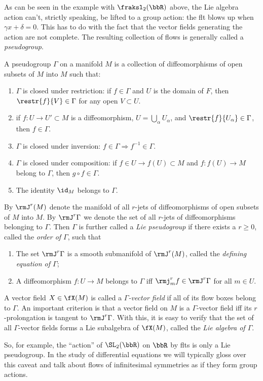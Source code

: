 \begin{rem}
    As can be seen in the example with $\fraksl_2(\bbR)$ above, the Lie algebra action can't, strictly speaking, be lifted to a group action: the \gls{flt} blows up when $\gamma x+\delta=0$. This has to do with the fact that the vector fields generating the action are not complete. The resulting collection of flows is generally called a \emph{pseudogroup}.

    A pseudogroup $\Gamma$ on a manifold $M$ is a collection of diffeomorphisms of open subsets of $M$ into $M$ such that:
    \begin{enumerate}[label=(\arabic*)]
        \item $\Gamma$ is closed under restriction: if $f\in \Gamma$ and $U$ is the domain of $F$, then $\restr{f}{V}\in\Gamma$ for any open $V\subset U$.
        \item if $f:U\to U'\subset M$ is a diffeomorphism, $U=\bigcup_\alpha U_\alpha$, and $\restr{f}{U_\alpha}\in\Gamma$, then $f\in \Gamma$.
        \item $\Gamma$ is closed under inversion: $f\in\Gamma\Rightarrow f^{-1}\in\Gamma$.
        \item $\Gamma$ is closed under composition: if $f\in U\to f(U)\subset M$ and $f:f(U)\to M$ belong to $\Gamma$, then $g\circ f\in\Gamma$.
        \item The identity $\id_M$ belongs to $\Gamma$.
    \end{enumerate}
    By $\rmJ^r(M)$ denote the manifold of all $r$-jets of diffeomorphisms of open subsets of $M$ into $M$. By $\rmJ^r \Gamma$ we denote the set of all $r$-jets of diffeomorphisms belonging to $\Gamma$. Then $\Gamma$ is further called a \emph{Lie pseudogroup} if there exists a $r\geq 0$, called the \emph{order of $\Gamma$}, such that 
    \begin{enumerate}[label=(\arabic*)]
        \item The set $\rmJ^r \Gamma$ is a smooth submanifold of $\rmJ^r(M)$, called the \emph{defining equation of $\Gamma$};
        \item A diffeomorphism $f:U\to M$ belongs to $\Gamma$ iff $\rmj^r_m f\in \rmJ^r \Gamma$ for all $m\in U$.
    \end{enumerate}
    A vector field $X\in\fX(M)$ is called a \emph{$\Gamma$-vector field} if all of its flow boxes belong to $\Gamma$. An important criterion is that a vector field on $M$ is a $\Gamma$-vector field iff its $r$-prolongation is tangent to $\rmJ^r\Gamma$. With this, it is easy to verify that the set of all $\Gamma$-vector fields forms a Lie subalgebra of $\fX(M)$, called the \emph{Lie algebra of $\Gamma$}.

    So, for example, the ``action'' of $\SL_2(\bbR)$ on $\bbR$ by \glspl{flt} is only a Lie pseudogroup. In the study of differential equations we will typically gloss over this caveat and talk about flows of infinitesimal symmetries as if they form group actions.
\end{rem}






